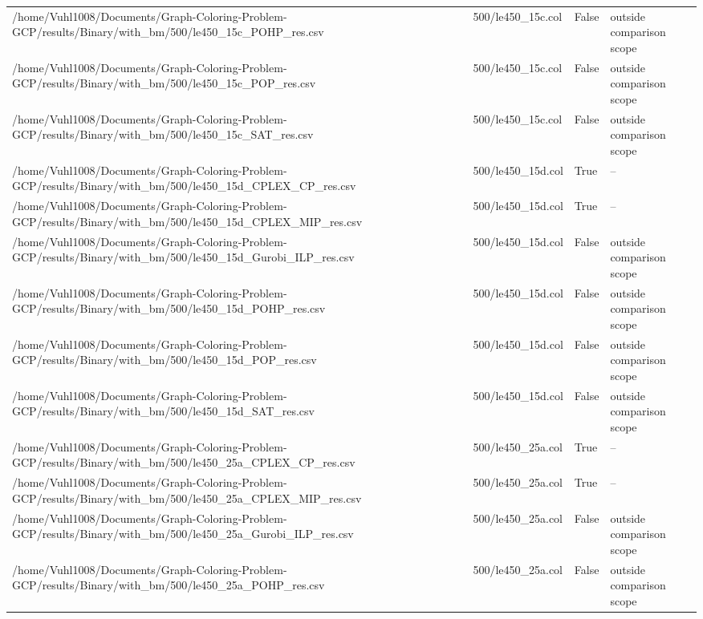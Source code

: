 \begin{table}[htbp]
\begin{tabular}{llll}
/home/Vuhl1008/Documents/Graph-Coloring-Problem-GCP/results/Binary/with\_bm/500/le450\_15c\_POHP\_res.csv & 500/le450\_15c.col & False & outside comparison scope \\
/home/Vuhl1008/Documents/Graph-Coloring-Problem-GCP/results/Binary/with\_bm/500/le450\_15c\_POP\_res.csv & 500/le450\_15c.col & False & outside comparison scope \\
/home/Vuhl1008/Documents/Graph-Coloring-Problem-GCP/results/Binary/with\_bm/500/le450\_15c\_SAT\_res.csv & 500/le450\_15c.col & False & outside comparison scope \\
/home/Vuhl1008/Documents/Graph-Coloring-Problem-GCP/results/Binary/with\_bm/500/le450\_15d\_CPLEX\_CP\_res.csv & 500/le450\_15d.col & True & -- \\
/home/Vuhl1008/Documents/Graph-Coloring-Problem-GCP/results/Binary/with\_bm/500/le450\_15d\_CPLEX\_MIP\_res.csv & 500/le450\_15d.col & True & -- \\
/home/Vuhl1008/Documents/Graph-Coloring-Problem-GCP/results/Binary/with\_bm/500/le450\_15d\_Gurobi\_ILP\_res.csv & 500/le450\_15d.col & False & outside comparison scope \\
/home/Vuhl1008/Documents/Graph-Coloring-Problem-GCP/results/Binary/with\_bm/500/le450\_15d\_POHP\_res.csv & 500/le450\_15d.col & False & outside comparison scope \\
/home/Vuhl1008/Documents/Graph-Coloring-Problem-GCP/results/Binary/with\_bm/500/le450\_15d\_POP\_res.csv & 500/le450\_15d.col & False & outside comparison scope \\
/home/Vuhl1008/Documents/Graph-Coloring-Problem-GCP/results/Binary/with\_bm/500/le450\_15d\_SAT\_res.csv & 500/le450\_15d.col & False & outside comparison scope \\
/home/Vuhl1008/Documents/Graph-Coloring-Problem-GCP/results/Binary/with\_bm/500/le450\_25a\_CPLEX\_CP\_res.csv & 500/le450\_25a.col & True & -- \\
/home/Vuhl1008/Documents/Graph-Coloring-Problem-GCP/results/Binary/with\_bm/500/le450\_25a\_CPLEX\_MIP\_res.csv & 500/le450\_25a.col & True & -- \\
/home/Vuhl1008/Documents/Graph-Coloring-Problem-GCP/results/Binary/with\_bm/500/le450\_25a\_Gurobi\_ILP\_res.csv & 500/le450\_25a.col & False & outside comparison scope \\
/home/Vuhl1008/Documents/Graph-Coloring-Problem-GCP/results/Binary/with\_bm/500/le450\_25a\_POHP\_res.csv & 500/le450\_25a.col & False & outside comparison scope \\

\end{tabular}
\end{table}
